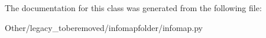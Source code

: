 The documentation for this class was generated from the following file\+:\begin{DoxyCompactItemize}
\item 
Other/legacy\+\_\+toberemoved/infomapfolder/infomap.\+py\end{DoxyCompactItemize}
